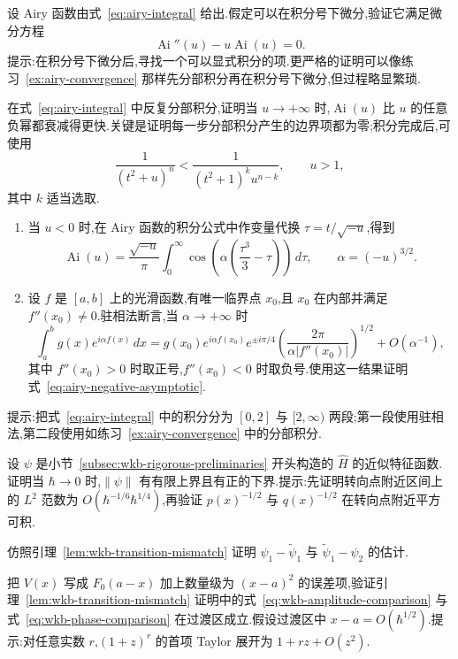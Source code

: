 \begin{exercise}[验证 Airy 方程]\label{ex:airy-equation-verification}
设 Airy 函数由式~\eqref{eq:airy-integral} 给出.假定可以在积分号下微分,验证它满足微分方程
\[
\operatorname{Ai}''(u)-u\operatorname{Ai}(u)=0.
\]
提示:在积分号下微分后,寻找一个可以显式积分的项.更严格的证明可以像练习~\ref{ex:airy-convergence} 那样先分部积分再在积分号下微分,但过程略显繁琐.
\end{exercise}

\begin{exercise}\label{ex:airy-rapid-decay}
在式~\eqref{eq:airy-integral} 中反复分部积分,证明当 $u\to+\infty$ 时,$\operatorname{Ai}(u)$ 比 $u$ 的任意负幂都衰减得更快.关键是证明每一步分部积分产生的边界项都为零;积分完成后,可使用
\[
\frac1{(t^2+u)^n}<\frac1{(t^2+1)^k u^{n-k}},\qquad u>1,
\]
其中 $k$ 适当选取.
\end{exercise}

\begin{exercise}\label{ex:airy-stationary-phase}
\begin{enumerate}
\item 当 $u<0$ 时,在 Airy 函数的积分公式中作变量代换 $\tau=t/\sqrt{-u}$,得到
\[
\operatorname{Ai}(u)=\frac{\sqrt{-u}}\pi\int_0^\infty\cos\left(\alpha\left(\frac{\tau^3}{3}-\tau\right)\right)\,d\tau,
\qquad \alpha=(-u)^{3/2}.
\]
\item 设 $f$ 是 $[a,b]$ 上的光滑函数,有唯一临界点 $x_0$,且 $x_0$ 在内部并满足 $f''(x_0)\neq0$.驻相法断言,当 $\alpha\to+\infty$ 时
\[
\int_a^b g(x)e^{i\alpha f(x)}\,dx
=g(x_0)e^{i\alpha f(x_0)}e^{\pm i\pi/4}
\left(\frac{2\pi}{\alpha|f''(x_0)|}\right)^{1/2}
+O(\alpha^{-1}),
\]
其中 $f''(x_0)>0$ 时取正号,$f''(x_0)<0$ 时取负号.使用这一结果证明式~\eqref{eq:airy-negative-asymptotic}.
\end{enumerate}
提示:把式~\eqref{eq:airy-integral} 中的积分分为 $[0,2]$ 与 $[2,\infty)$ 两段;第一段使用驻相法,第二段使用如练习~\ref{ex:airy-convergence} 中的分部积分.
\end{exercise}

\begin{exercise}[近似特征函数的范数]\label{ex:wkb-norm}
设 $\psi$ 是小节~\ref{subsec:wkb-rigorous-preliminaries} 开头构造的 $\widehat H$ 的近似特征函数.证明当 $\hbar\to0$ 时,$\|\psi\|$ 有有限上界且有正的下界.提示:先证明转向点附近区间上的 $L^2$ 范数为 $O(\hbar^{-1/6}\hbar^{1/4})$,再验证 $p(x)^{-1/2}$ 与 $q(x)^{-1/2}$ 在转向点附近平方可积.
\end{exercise}

\begin{exercise}\label{ex:wkb-mismatch-functions}
仿照引理~\ref{lem:wkb-transition-mismatch} 证明 $\psi_1-\widetilde\psi_1$ 与 $\widetilde\psi_1-\psi_2$ 的估计.
\end{exercise}

\begin{exercise}\label{ex:wkb-phase-expansion}
把 $V(x)$ 写成 $F_0(a-x)$ 加上数量级为 $(x-a)^2$ 的误差项,验证引理~\ref{lem:wkb-transition-mismatch} 证明中的式~\eqref{eq:wkb-amplitude-comparison} 与式~\eqref{eq:wkb-phase-comparison} 在过渡区成立.假设过渡区中 $x-a=O(\hbar^{1/2})$.提示:对任意实数 $r$,$(1+z)^r$ 的首项 Taylor 展开为 $1+rz+O(z^2)$.
\end{exercise}
